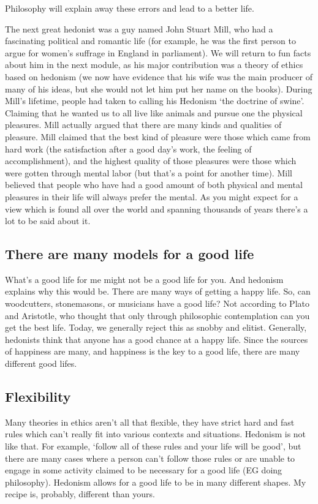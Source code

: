 Philosophy will explain away these errors and lead to a better life.

The next great hedonist was a guy named John Stuart Mill, who had a fascinating political and romantic life (for example, he was the first person to argue for women’s suffrage in England in parliament). We will return to fun facts about him in the next module, as his major contribution was a theory of ethics based on hedonism (we now have evidence that his wife was the main producer of many of his ideas, but she would not let him put her name on the books). During Mill’s lifetime, people had taken to calling his Hedonism ‘the doctrine of swine’. Claiming that he wanted us to all live like animals and pursue one the physical pleasures.  Mill actually argued that there are many kinds and qualities of pleasure. Mill claimed that the best kind of pleasure were those which came from hard work (the satisfaction after a good day’s work, the feeling of accomplishment), and the highest quality of those pleasures were those which were gotten through mental labor (but that’s a point for another time). Mill believed that people who have had a good amount of both physical and mental pleasures in their life will always prefer the mental. As you might expect for a view which is found all over the world and spanning thousands of years there’s a lot to be said about it. 

\subsection{There are many models for a good life}

What’s a good life for me might not be a good life for you. And hedonism explains why this would be. There are many ways of getting a happy life. So, can woodcutters, stonemasons, or musicians have a good life? Not according to Plato and Aristotle, who thought that only through philosophic contemplation can you get the best life. Today, we generally reject this as snobby and elitist. Generally, hedonists think that anyone has a good chance at a happy life. Since the sources of happiness are many, and happiness is the key to a good life, there are many different good lifes.
\subsection{Flexibility}

Many theories in ethics aren’t all that flexible, they have strict hard and fast rules which can’t really fit into various contexts and situations. Hedonism is not like that. For example, ‘follow all of these rules and your life will be good’, but there are many cases where a person can’t follow those rules or are unable to engage in some activity claimed to be necessary for a good life (EG doing philosophy). Hedonism allows for a good life to be in many different shapes. My recipe is, probably, different than yours.
